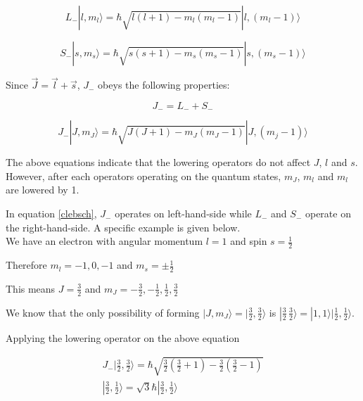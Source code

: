 \documentclass[12pt,journal,compsoc]{IEEEtran}
\begin{document}
\begin{equation}
L_{-} |l,m_l \rangle = \hbar \sqrt{l(l+1)-m_l(m_l - 1)} |l,(m_l - 1) \rangle
\label{l}
\end{equation}

\begin{equation}
S_{-} |s,m_s \rangle = \hbar \sqrt{s(s+1)-m_s(m_s - 1)} |s,(m_s - 1) \rangle
\label{s}
\end{equation}

Since $\vec{J}= \vec{l}+ \vec{s}$, $J_{-}$ obeys the following properties:

\begin{equation}
J_{-}= L_{-} + S_{-}
\label{jsum}
\end{equation}

\begin{equation}
J_{-} |J,m_J \rangle = \hbar \sqrt{J(J+1)-m_J(m_J - 1)} |J,(m_j  - 1) \rangle
\label{j}
\end{equation}

The above equations indicate that the lowering operators do not affect $J$, $l$ and $s$. However, after each operators operating on the quantum states, $m_J$, $m_l$ and $m_l$ are lowered by 1. 

In equation \ref{clebsch}, $J_-$ operates on left-hand-side while $L_-$ and $S_-$ operate on the right-hand-side. A specific example is given below.\\

We have an electron with angular momentum $l=1$ and spin $s=\frac{1}{2}$

Therefore $m_l=-1,0,-1$ and $m_s= \pm \frac{1}{2}$

This means $J=\frac{3}{2}$ and $m_J= -\frac{3}{2}, - \frac{1}{2}, \frac{1}{2}, \frac{3}{2}$

We know that the only possibility of forming $|J,m_J\rangle= |\frac{3}{2},\frac{3}{2}\rangle$ is $|\frac{3}{2}\,\frac{3}{2}\rangle = |1,1\rangle |\frac{1}{2},\frac{1}{2}\rangle $.

Applying the lowering operator on the above equation

\begin{equation}
\begin{aligned}
J_{-}|\frac{3}{2},\frac{3}{2}\rangle =  \hbar \sqrt{\frac{3}{2} \left( \frac{3}{2}+1 \right) -  \frac{3}{2} \left( \frac{3}{2}-1 \right)} \\|\frac{3}{2},\frac{1}{2}\rangle = \sqrt{3} \hbar |\frac{3}{2},\frac{1}{2}\rangle
\end{aligned}
\end{equation}
\end{document}
